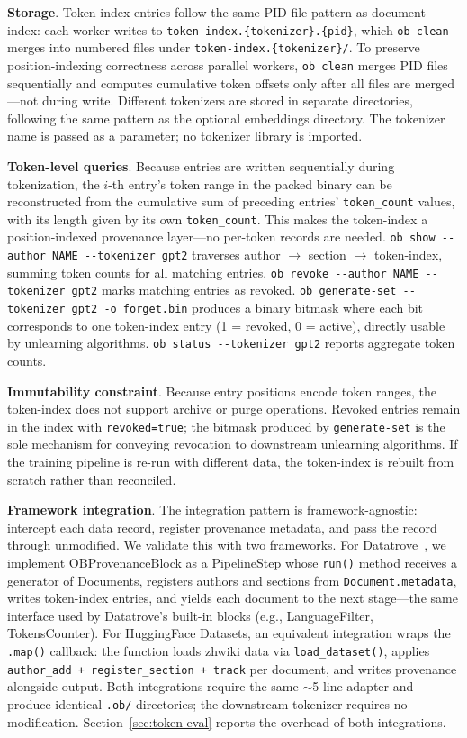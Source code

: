 \textbf{Storage}. Token-index entries follow the same PID file pattern as document-index: each worker writes to \texttt{token-index.\{tokenizer\}.\{pid\}}, which \texttt{ob clean} merges into numbered files under \texttt{token-index.\{tokenizer\}/}. To preserve position-indexing correctness across parallel workers, \texttt{ob clean} merges PID files sequentially and computes cumulative token offsets only after all files are merged---not during write. Different tokenizers are stored in separate directories, following the same pattern as the optional embeddings directory. The tokenizer name is passed as a parameter; no tokenizer library is imported.

\textbf{Token-level queries}. Because entries are written sequentially during tokenization, the $i$-th entry's token range in the packed binary can be reconstructed from the cumulative sum of preceding entries' \texttt{token\_count} values, with its length given by its own \texttt{token\_count}. This makes the token-index a position-indexed provenance layer---no per-token records are needed. \texttt{ob show -{}-author NAME -{}-tokenizer gpt2} traverses author $\rightarrow$ section $\rightarrow$ token-index, summing token counts for all matching entries. \texttt{ob revoke -{}-author NAME -{}-tokenizer gpt2} marks matching entries as revoked. \texttt{ob generate-set -{}-tokenizer gpt2 -o forget.bin} produces a binary bitmask where each bit corresponds to one token-index entry (1 = revoked, 0 = active), directly usable by unlearning algorithms. \texttt{ob status -{}-tokenizer gpt2} reports aggregate token counts.

\textbf{Immutability constraint}. Because entry positions encode token ranges, the token-index does not support archive or purge operations. Revoked entries remain in the index with \texttt{revoked=true}; the bitmask produced by \texttt{generate-set} is the sole mechanism for conveying revocation to downstream unlearning algorithms. If the training pipeline is re-run with different data, the token-index is rebuilt from scratch rather than reconciled.

\textbf{Framework integration}. The integration pattern is framework-agnostic: intercept each data record, register provenance metadata, and pass the record through unmodified. We validate this with two frameworks. For Datatrove~\cite{penedo2024datatrove}, we implement OBProvenanceBlock as a PipelineStep whose \texttt{run()} method receives a generator of Documents, registers authors and sections from \texttt{Document.metadata}, writes token-index entries, and yields each document to the next stage---the same interface used by Datatrove's built-in blocks (e.g., LanguageFilter, TokensCounter). For HuggingFace Datasets, an equivalent integration wraps the \texttt{.map()} callback: the function loads zhwiki data via \texttt{load\_dataset()}, applies \texttt{author\_add + register\_section + track} per document, and writes provenance alongside output. Both integrations require the same $\sim$5-line adapter and produce identical \texttt{.ob/} directories; the downstream tokenizer requires no modification. Section~\ref{sec:token-eval} reports the overhead of both integrations.
